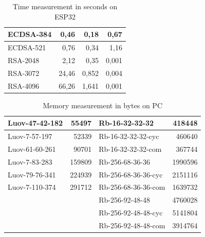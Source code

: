 \documentclass[thesis=M,english]{FITthesis}[2019/12/23]
\begin{document}
\begin{table}[]
\begin{tabular}{|l|r|r|r|}
 ECDSA-384           &  0,46                            &  0,18                         &  0,67                              \\ \hline
 ECDSA-521           &  0,76                            &  0,34                         &  1,16                              \\ \hline
 RSA-2048            &  2,12                            &  0,35                         &  0,001                             \\ \hline
 RSA-3072            &  24,46                           &  0,852                        &  0,004                             \\ \hline
 RSA-4096            &  66,26                           &  1,641                        &  0,001                             \\ \hline
\end{tabular}
\caption{Time measurement in seconds on ESP32}
\end{table}

\begin{table}[]
\centering
\begin{tabular}{|l|r|l|r|}
\hline
Luov-47-42-182 & 55497 & Rb-16-32-32-32 & 418448 \\ \hline
Luov-7-57-197                         & 52339                        & Rb-16-32-32-32-cyc                    & 460640                        \\ \hline
Luov-61-60-261                        & 90701                        & Rb-16-32-32-32-com                    & 367744                        \\ \hline
Luov-7-83-283                         & 159809                       & Rb-256-68-36-36                       & 1990596                       \\ \hline
Luov-79-76-341                        & 224939                       & Rb-256-68-36-36-cyc                   & 2151116                       \\ \hline
Luov-7-110-374                        & 291712                       & Rb-256-68-36-36-com                   & 1639732                       \\ \hline
                                      &                              & Rb-256-92-48-48                       & 4760028                       \\ \hline
                                      &                              & Rb-256-92-48-48-cyc                   & 5141804                       \\ \hline
                                      &                              & Rb-256-92-48-48-com                   & 3914764                       \\ \hline
\end{tabular}
\caption{Memory measurement in bytes on PC}
\end{table}
\end{document}
